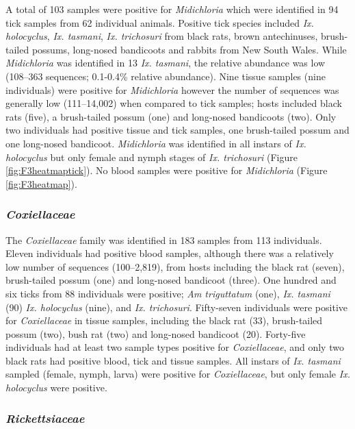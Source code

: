 \documentclass[a4paper, nobind]{templates/ociamthesis}
\begin{document}
A total of 103 samples were positive for \emph{Midichloria} which were identified in 94 tick samples from 62 individual animals.
Positive tick species included \emph{Ix. holocyclus}, \emph{Ix. tasmani}, \emph{Ix. trichosuri} from black rats, brown antechinuses, brush-tailed possums, long-nosed bandicoots and rabbits from New South Wales.
While \emph{Midichloria} was identified in 13 \emph{Ix. tasmani}, the relative abundance was low (108--363 sequences; 0.1-0.4\% relative abundance).
Nine tissue samples (nine individuals) were positive for \emph{Midichloria} however the number of sequences was generally low (111--14,002) when compared to tick samples; hosts included black rats (five), a brush-tailed possum (one) and long-nosed bandicoots (two).
Only two individuals had positive tissue and tick samples, one brush-tailed possum and one long-nosed bandicoot.
\emph{Midichloria} was identified in all instars of \emph{Ix. holocyclus} but only female and nymph stages of \emph{Ix. trichosuri} (Figure \ref{fig:F3heatmaptick}).
No blood samples were positive for \emph{Midichloria} (Figure \ref{fig:F3heatmap}).

\hypertarget{coxiellaceae}{%
\subsubsection{\texorpdfstring{\emph{Coxiellaceae}}{Coxiellaceae}}\label{coxiellaceae}}

The \emph{Coxiellaceae} family was identified in 183 samples from 113 individuals. Eleven individuals had positive blood samples, although there was a relatively low number of sequences (100--2,819), from hosts including the black rat (seven), brush-tailed possum (one) and long-nosed bandicoot (three).
One hundred and six ticks from 88 individuals were positive; \emph{Am triguttatum} (one), \emph{Ix. tasmani} (90) \emph{Ix. holocyclus} (nine), and \emph{Ix. trichosuri}.
Fifty-seven individuals were positive for \emph{Coxiellaceae} in tissue samples, including the black rat (33), brush-tailed possum (two), bush rat (two) and long-nosed bandicoot (20).
Forty-five individuals had at least two sample types positive for \emph{Coxiellaceae}, and only two black rats had positive blood, tick and tissue samples.
All instars of \emph{Ix. tasmani} sampled (female, nymph, larva) were positive for \emph{Coxiellaceae}, but only female \emph{Ix. holocyclus} were positive.

\hypertarget{rickettsiaceae}{%
\subsubsection{\texorpdfstring{\emph{Rickettsiaceae}}{Rickettsiaceae}}\label{rickettsiaceae}}
\end{document}

